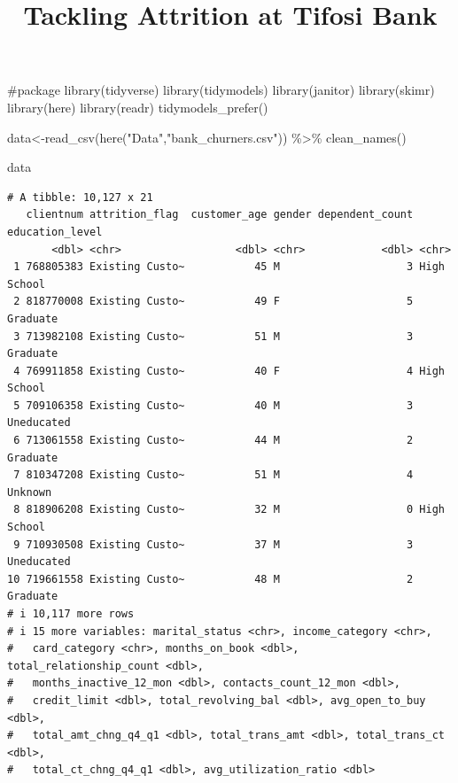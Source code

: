 \documentclass[
  letterpaper,
  DIV=11,
  numbers=noendperiod]{scrartcl}
\title{Tackling Attrition at Tifosi Bank}
\author{}
\date{}
\newenvironment{Shaded}{\begin{snugshade}}{\end{snugshade}}
\newcommand{\CommentTok}[1]{\textcolor[rgb]{0.37,0.37,0.37}{#1}}
\newcommand{\FunctionTok}[1]{\textcolor[rgb]{0.28,0.35,0.67}{#1}}
\newcommand{\NormalTok}[1]{\textcolor[rgb]{0.00,0.23,0.31}{#1}}
\newcommand{\OtherTok}[1]{\textcolor[rgb]{0.00,0.23,0.31}{#1}}
\newcommand{\SpecialCharTok}[1]{\textcolor[rgb]{0.37,0.37,0.37}{#1}}
\newcommand{\StringTok}[1]{\textcolor[rgb]{0.13,0.47,0.30}{#1}}
\begin{document}
\maketitle


\begin{Shaded}
\begin{Highlighting}[]
\CommentTok{\#package}
\FunctionTok{library}\NormalTok{(tidyverse)}
\FunctionTok{library}\NormalTok{(tidymodels)}
\FunctionTok{library}\NormalTok{(janitor)}
\FunctionTok{library}\NormalTok{(skimr)}
\FunctionTok{library}\NormalTok{(here)}
\FunctionTok{library}\NormalTok{(readr)}
\FunctionTok{tidymodels\_prefer}\NormalTok{()}
\end{Highlighting}
\end{Shaded}

\begin{Shaded}
\begin{Highlighting}[]
\NormalTok{data}\OtherTok{\textless{}{-}}\FunctionTok{read\_csv}\NormalTok{(}\FunctionTok{here}\NormalTok{(}\StringTok{"Data"}\NormalTok{,}\StringTok{"bank\_churners.csv"}\NormalTok{)) }\SpecialCharTok{\%\textgreater{}\%} 
  \FunctionTok{clean\_names}\NormalTok{()}
\end{Highlighting}
\end{Shaded}

\begin{Shaded}
\begin{Highlighting}[]
\NormalTok{data}
\end{Highlighting}
\end{Shaded}

\begin{verbatim}
# A tibble: 10,127 x 21
   clientnum attrition_flag  customer_age gender dependent_count education_level
       <dbl> <chr>                  <dbl> <chr>            <dbl> <chr>          
 1 768805383 Existing Custo~           45 M                    3 High School    
 2 818770008 Existing Custo~           49 F                    5 Graduate       
 3 713982108 Existing Custo~           51 M                    3 Graduate       
 4 769911858 Existing Custo~           40 F                    4 High School    
 5 709106358 Existing Custo~           40 M                    3 Uneducated     
 6 713061558 Existing Custo~           44 M                    2 Graduate       
 7 810347208 Existing Custo~           51 M                    4 Unknown        
 8 818906208 Existing Custo~           32 M                    0 High School    
 9 710930508 Existing Custo~           37 M                    3 Uneducated     
10 719661558 Existing Custo~           48 M                    2 Graduate       
# i 10,117 more rows
# i 15 more variables: marital_status <chr>, income_category <chr>,
#   card_category <chr>, months_on_book <dbl>, total_relationship_count <dbl>,
#   months_inactive_12_mon <dbl>, contacts_count_12_mon <dbl>,
#   credit_limit <dbl>, total_revolving_bal <dbl>, avg_open_to_buy <dbl>,
#   total_amt_chng_q4_q1 <dbl>, total_trans_amt <dbl>, total_trans_ct <dbl>,
#   total_ct_chng_q4_q1 <dbl>, avg_utilization_ratio <dbl>
\end{verbatim}
\end{document}
